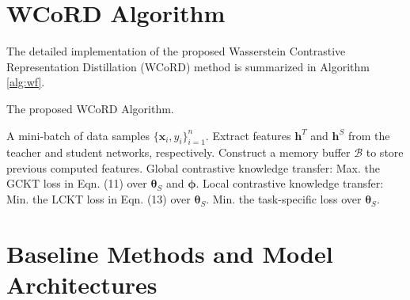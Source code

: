 \documentclass[final]{cvpr}
\newcommand{\hv}{{\boldsymbol h}}
\newcommand{\xv}{{\boldsymbol x}}
\newcommand{\thetav}{{\boldsymbol \theta}}
\newcommand{\phiv}{{\boldsymbol \phi}}
\newcommand{\Bcal}{\mathcal{B}}
\theoremstyle{definition}
\begin{document}
\section{WCoRD Algorithm}
The detailed implementation of the proposed Wasserstein Contrastive Representation Distillation (WCoRD) method is summarized in Algorithm \ref{alg:wf}.
\begin{algorithm}[!h]
\caption{The proposed WCoRD Algorithm.}
\label{alg:wf}
\begin{algorithmic}[1]
 A mini-batch of data samples $\{\xv_i, y_i\}_{i=1}^n$.
\STATE Extract features $\hv^T$ and $\hv^S$ from the teacher and student networks, respectively.
\STATE Construct a memory buffer $\Bcal$ to store previous computed features.
\STATE Global contrastive knowledge transfer: 
\STATE \quad Max. the GCKT loss in Eqn. (11) over $\thetav_S$ and $\phiv$.
\STATE Local contrastive knowledge transfer: 
\STATE \quad Min. the LCKT loss in Eqn. (13) over $\thetav_S$.
\STATE Min. the task-specific loss over $\thetav_S$.
\end{algorithmic}
\end{algorithm} 









\section{Baseline Methods and Model Architectures}
\end{document}
